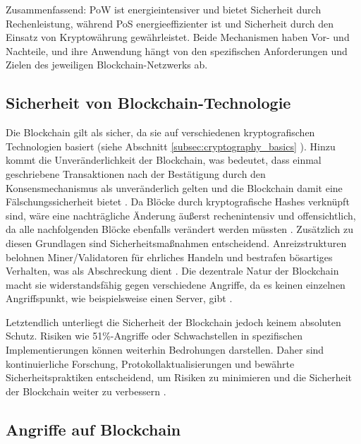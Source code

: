 \noindent Zusammenfassend: PoW ist energieintensiver und bietet Sicherheit durch Rechenleistung, während PoS energieeffizienter ist und Sicherheit durch den Einsatz von Kryptowährung gewährleistet. Beide Mechanismen haben Vor- und Nachteile, und ihre Anwendung hängt von den spezifischen Anforderungen und Zielen des jeweiligen Blockchain-Netzwerks ab.


\subsection{Sicherheit von Blockchain-Technologie}

Die Blockchain gilt als sicher, da sie auf verschiedenen kryptografischen Technologien basiert (siehe Abschnitt \ref{subsec:cryptography_basics} \textit{}). Hinzu kommt die Unveränderlichkeit der Blockchain, was bedeutet, dass einmal geschriebene Transaktionen nach der Bestätigung durch den Konsensmechanismus als unveränderlich gelten und die Blockchain damit eine Fälschungssicherheit bietet \Parencites[S. 1-2]{Landerreche_ImmutabilityOfBlockchains}[S. 70]{Brünnler_BlockchainKurzGut}. Da Blöcke durch kryptografische Hashes verknüpft sind, wäre eine nachträgliche Änderung äußerst rechenintensiv und offensichtlich, da alle nachfolgenden Blöcke ebenfalls verändert werden müssten \Parencite[S. 12]{Fill_BlockchainGrundlagen}. Zusätzlich zu diesen Grundlagen sind Sicherheitsmaßnahmen entscheidend. Anreizstrukturen belohnen Miner/Validatoren für ehrliches Handeln und bestrafen bösartiges Verhalten, was als Abschreckung dient \parencite[S. 320-321]{Antonopoulos_MasteringEthereum}. Die dezentrale Natur der Blockchain macht sie widerstandsfähig gegen verschiedene Angriffe, da es keinen einzelnen Angriffspunkt, wie beispielsweise einen Server, gibt \parencite[S. 31]{Fill_BlockchainGrundlagen}.

Letztendlich unterliegt die Sicherheit der Blockchain jedoch keinem absoluten Schutz. Risiken wie 51\%-Angriffe oder Schwachstellen in spezifischen Implementierungen können weiterhin Bedrohungen darstellen. Daher sind kontinuierliche Forschung, Protokollaktualisierungen und bewährte Sicherheitspraktiken entscheidend, um Risiken zu minimieren und die Sicherheit der Blockchain weiter zu verbessern \parencites{Nam_51PercentAttacks}{Perez_SmartContractVulnerabilities}.


\subsection{Angriffe auf Blockchain}

